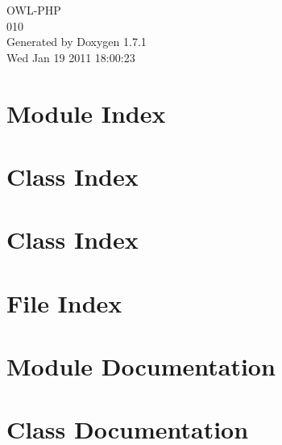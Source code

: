 \documentclass[a4paper]{book}
\begin{document}
\begin{titlepage}
\vspace*{7cm}
\begin{center}
{\Large OWL-\/PHP \\[1ex]\large 010 }\\
\vspace*{1cm}
{\large Generated by Doxygen 1.7.1}\\
\vspace*{0.5cm}
{\small Wed Jan 19 2011 18:00:23}\\
\end{center}
\end{titlepage}
\clearemptydoublepage
{}
\tableofcontents
\clearemptydoublepage
{}
\chapter{Module Index}

\chapter{Class Index}

\chapter{Class Index}

\chapter{File Index}

\chapter{Module Documentation}





\chapter{Class Documentation}









































\end{document}

